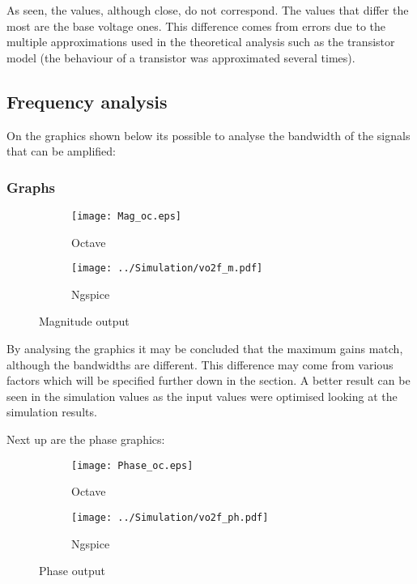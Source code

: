 As seen, the values, although close, do not correspond. The values that differ the most are the base voltage ones. This difference comes from errors due to the multiple approximations used in the theoretical analysis such as the transistor model (the behaviour of a transistor was approximated several times). 

\subsection{Frequency analysis}

On the graphics shown below its possible to analyse the bandwidth of the signals that can be amplified: 

\subsubsection*{Graphs}

\begin{figure}[H]
\centering
\begin{subfigure}{.48\textwidth}
  \centering
  \texttt{[image: Mag\_oc.eps]}
  \caption{Octave}
  \label{fig:MagOC}
\end{subfigure}%
\begin{subfigure}{.48\textwidth}
  \centering
  \texttt{[image: ../Simulation/vo2f\_m.pdf]}
  \caption{Ngspice}
  \label{fig:MagNG}
\end{subfigure}
\caption{Magnitude output}
\label{fig:Mag}
\end{figure}

By analysing the graphics it may be concluded that the maximum gains match, although the bandwidths are different. This difference may come from various factors which will be specified further down in the section. A better result can be seen in the simulation values as the input values were optimised looking at the simulation results. \bigskip

Next up are the phase graphics:

\begin{figure}[H]
\centering
\begin{subfigure}{.48\textwidth}
  \centering
  \texttt{[image: Phase\_oc.eps]}
  \caption{Octave}
  \label{fig:PhaOC}
\end{subfigure}
\begin{subfigure}{.48\textwidth}
  \centering
  \texttt{[image: ../Simulation/vo2f\_ph.pdf]}
  \caption{Ngspice}
  \label{fig:PhaNG}
\end{subfigure}
\caption{Phase output}
\label{fig:Phase}
\end{figure}


